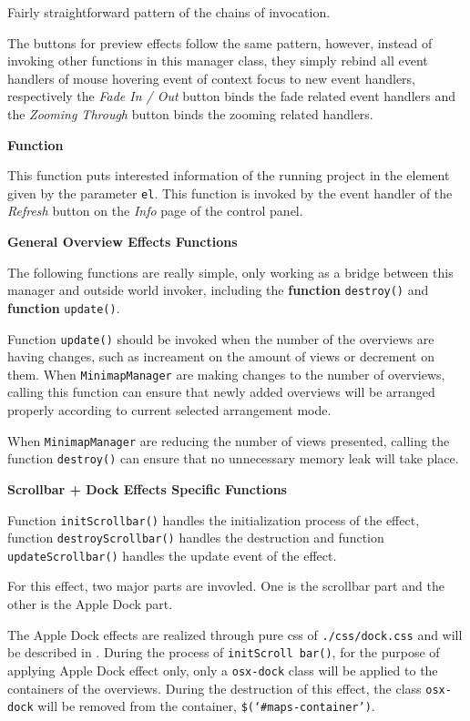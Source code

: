 Fairly straightforward pattern of the chains of invocation.

The buttons for preview effects follow the same pattern, however, instead of invoking other functions in this manager class, they simply rebind all event handlers of mouse hovering event of context focus to new event handlers, respectively the \emph{Fade In / Out} button binds the fade related event handlers and the \emph{Zooming Through} button binds the zooming related handlers.

\textbf{Function} 

This function puts interested information of the running project in the element given by the parameter \texttt{el}. This function is invoked by the event handler of the \emph{Refresh} button on the \emph{Info} page of the control panel.

\textbf{General Overview Effects Functions}

The following functions are really simple, only working as a bridge between this manager and outside world invoker, including the \textbf{function} \texttt{destroy()} and \textbf{function} \texttt{update()}.

Function \texttt{update()} should be invoked when the number of the overviews are having changes, such as increament on the amount of views or decrement on them. When \texttt{MinimapManager} are making changes to the number of overviews, calling this function can ensure that newly added overviews will be arranged properly according to current selected arrangement mode. 

When \texttt{MinimapManager} are reducing the number of views presented, calling the function \texttt{destroy()} can ensure that no unnecessary memory leak will take place.

\textbf{Scrollbar + Dock Effects Specific Functions}

Function \texttt{initScrollbar()} handles the initialization process of the effect, function \texttt{destroyScrollbar()} handles the destruction and function \texttt{updateScrollbar()} handles the update event of the effect.

For this effect, two major parts are invovled. One is the scrollbar part and the other is the Apple Dock part.

The Apple Dock effects are realized through pure \gls{css} of \texttt{./css/dock.css} and will be described in . During the process of \texttt{initScroll bar()}, for the purpose of applying Apple Dock effect only, only a \texttt{osx-dock} class will be applied to the containers of the overviews. During the destruction of this effect, the class \texttt{osx-dock} will be removed from the container, \texttt{\$(`\#maps-container')}.


